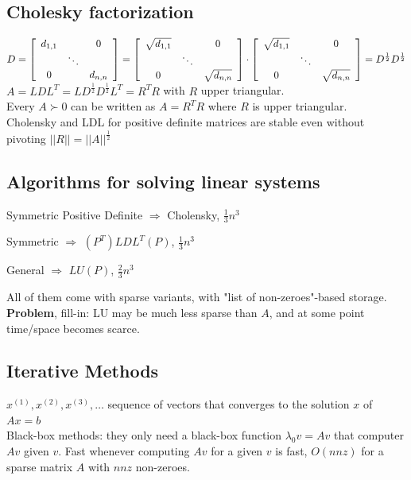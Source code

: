 \documentclass[10pt]{report}
\begin{document}
\subsection{Cholesky factorization} $D = \left[\begin{array}{c c c}
d_{1,1}& & 0\\
& \ddots & \\
0 & & d_{n,n}
\end{array}\right] = \left[\begin{array}{c c c}
\sqrt{d_{1,1}}& & 0\\
& \ddots & \\
0 & & \sqrt{d_{n,n}}
\end{array}\right]\cdot\left[\begin{array}{c c c}
\sqrt{d_{1,1}}& & 0\\
& \ddots & \\
0 & & \sqrt{d_{n,n}}
\end{array}\right] = D^{\frac{1}{2}}D^{\frac{1}{2}}$\\
$A = LDL^T = LD^{\frac{1}{2}}D^{\frac{1}{2}}L^T = R^T R$ with $R$ upper triangular.\\
Every $A \succ 0$ can be written as $A = R^T R$ where $R$ is upper triangular.\\
Cholensky and LDL for positive definite matrices are stable even without pivoting $||R||=||A||^{\frac{1}{2}}$
\subsection{Algorithms for solving linear systems}
\begin{list}{}{}
	\item Symmetric Positive Definite $\Rightarrow$ Cholensky, $\frac{1}{3}n^3$
	\item Symmetric $\Rightarrow$ $(P^T)LDL^T(P)$, $\frac{1}{3}n^3$
	\item General $\Rightarrow$ $LU(P)$, $\frac{2}{3}n^3$
\end{list}
All of them come with sparse variants, with "list of non-zeroes"-based storage. \textbf{Problem}, fill-in: LU may be much less sparse than $A$, and at some point time/space becomes scarce.
\subsection{Iterative Methods} $x^{(1)}, x^{(2)}, x^{(3)},\ldots$ sequence of vectors that converges to the solution $x$ of $Ax = b$\\
Black-box methods: they only need a black-box function $\lambda_0v=Av$ that computer $Av$ given $v$. Fast whenever computing $Av$ for a given $v$ is fast, $O(nnz)$ for a sparse matrix $A$ with $nnz$ non-zeroes.
\end{document}
